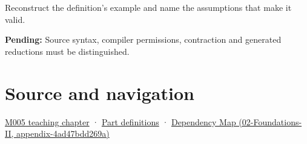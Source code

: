 Reconstruct the definition's example and name the assumptions that make it valid.

\textbf{Pending:} Source syntax, compiler permissions, contraction and generated reductions must be distinguished.

\section{Source and navigation}\label{appendix-c2ac4a84c283-source-and-navigation}

\href{Continuous\%20Notes/Computing\%20Foundations\%20-\%20From\%20Bits\%20to\%20C++\%20and\%20Systems\%20APIs\#When\%20arithmetic\%20meets\%20uncertainty}{M005 teaching chapter} · \hyperref[appendix-fd090d982a15-m005---parts-77-88]{Part definitions} · \href{../02-Foundations-II/main.pdf\#nameddest=appendix-4ad47bdd269a}{Dependency Map (02-Foundations-II, appendix-4ad47bdd269a)}
